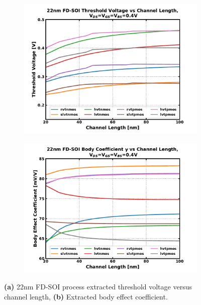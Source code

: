 		\begin{figure}[htb!]
		    \centering
		    \begin{subfigure}{0.5\textwidth}
		        \centering
		        \includegraphics[width=1\textwidth, angle=0]{./figs/design/vth}
		        \caption{ }
		        \label{fig:vth_vs_len}
		    \end{subfigure}%
		    \begin{subfigure}{0.5\textwidth}
		        \centering
		        \includegraphics[width=1\textwidth, angle=0]{./figs/design/gamma}
		        \caption{ }
		        \label{fig:gamma_vs_len}
		    \end{subfigure}
		    \label{fig:vth_groupb}
		    \caption{\textbf{(a)} 22nm FD-SOI process extracted threshold voltage versus channel length, \textbf{(b)} Extracted body effect coefficient.}
		\end{figure} 


